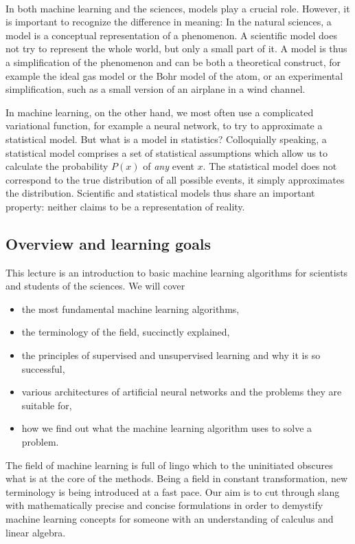 \\
In both machine learning and the sciences, models play a crucial role. However, it is important to recognize the difference in meaning: In the natural sciences, a model is a conceptual representation of a phenomenon. A scientific model does not try to represent the whole world, but only a small part of it. A model is thus a simplification of the phenomenon and can be both a theoretical construct, for example the ideal gas model or the Bohr model of the atom, or an experimental simplification, such as a small version of an airplane in a wind channel.

In machine  learning, on the other hand, we most often use a complicated variational function, for example a neural network, to try to approximate a statistical model. But what is a model in statistics? Colloquially speaking, a statistical model comprises a set of statistical assumptions which allow us to calculate the probability $P(x)$ of \emph{any} event $x$. The statistical model does not correspond to the true distribution of all possible events, it simply approximates the distribution.
Scientific and statistical models thus share an important property: neither claims to be a representation of reality.


\subsection{Overview and learning goals}
This lecture is an introduction to basic machine learning algorithms for scientists and students of the sciences.
We will cover
\begin{itemize}
\setlength\itemsep{-0.2em}
    \item the most fundamental machine learning algorithms,
    \item the terminology of the field, succinctly explained,
    \item the principles of supervised and unsupervised learning and why it is so successful,
    \item various architectures of artificial neural networks and the problems they are suitable for,
    \item how we find out what the machine learning algorithm uses to solve a problem.
\end{itemize}

The field of machine learning is full of lingo which to the uninitiated obscures what is at the core of the methods. Being a field in constant transformation, new terminology is being introduced at a fast pace. Our aim is to cut through slang with mathematically precise and concise formulations in order to demystify machine learning concepts for someone with an understanding of calculus and linear algebra.


